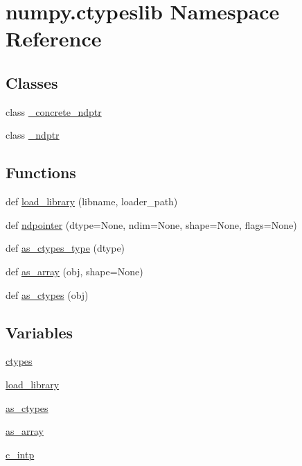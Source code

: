 \hypertarget{namespacenumpy_1_1ctypeslib}{}\section{numpy.\+ctypeslib Namespace Reference}
\label{namespacenumpy_1_1ctypeslib}
\subsection*{Classes}
\begin{DoxyCompactItemize}
\item 
class \hyperlink{classnumpy_1_1ctypeslib_1_1__concrete__ndptr}{\+\_\+concrete\+\_\+ndptr}
\item 
class \hyperlink{classnumpy_1_1ctypeslib_1_1__ndptr}{\+\_\+ndptr}
\end{DoxyCompactItemize}
\subsection*{Functions}
\begin{DoxyCompactItemize}
\item 
def \hyperlink{namespacenumpy_1_1ctypeslib_a001f7f1a75e034d49fe3be3c8350b7a2}{load\+\_\+library} (libname, loader\+\_\+path)
\item 
def \hyperlink{namespacenumpy_1_1ctypeslib_aa73ff2a745cc30ff0987c2abfe42c083}{ndpointer} (dtype=None, ndim=None, shape=None, flags=None)
\item 
def \hyperlink{namespacenumpy_1_1ctypeslib_ab7c52e800950b05eaf233b42439899fa}{as\+\_\+ctypes\+\_\+type} (dtype)
\item 
def \hyperlink{namespacenumpy_1_1ctypeslib_a8e6a6d1304a80b484c3c410d224e3983}{as\+\_\+array} (obj, shape=None)
\item 
def \hyperlink{namespacenumpy_1_1ctypeslib_a231716ff579fb72c032e317a5e4eae06}{as\+\_\+ctypes} (obj)
\end{DoxyCompactItemize}
\subsection*{Variables}
\begin{DoxyCompactItemize}
\item 
\hyperlink{namespacenumpy_1_1ctypeslib_aa55fe1323acc4dfaa148b7bd00a6adca}{ctypes}
\item 
\hyperlink{namespacenumpy_1_1ctypeslib_af364318398d59bd06954479e2c83ee9a}{load\+\_\+library}
\item 
\hyperlink{namespacenumpy_1_1ctypeslib_a4fa55c56be70202333cc5f4e003adfda}{as\+\_\+ctypes}
\item 
\hyperlink{namespacenumpy_1_1ctypeslib_a16d8dda8b2f58d1a497661b229f3cbad}{as\+\_\+array}
\item 
\hyperlink{namespacenumpy_1_1ctypeslib_a84046f05997c7f2e140e53fd4ae130bf}{c\+\_\+intp}
\end{DoxyCompactItemize}


